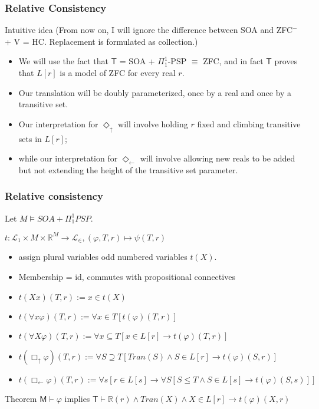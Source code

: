 \documentclass{beamer}
\newcommand{\du}{\Diamond_\uparrow}
\newcommand{\dl}{\Diamond_\leftarrow}
\newcommand{\bu}{\Box_\uparrow}
\newcommand{\bl}{\Box_\leftarrow}
\begin{document}
\begin{frame}
    \frametitle{Relative Consistency}
\begin{block}{Intuitive idea}
     (From now on, I will ignore the difference between SOA 
    and ZFC$^-$+ V = HC. Replacement is formulated as collection.)
    \begin{itemize}
    \item<3-> We will use the fact that $\mathsf{T}$ = SOA + $\Pi_1^1$-PSP 
    $\equiv$ ZFC, and in fact $\mathsf{T}$ proves that $L[r]$ is a 
    model of ZFC for every real $r$. 
    \item<4-> 
    Our translation will be doubly parameterized, once by a real and 
    once by a transitive set.
    \item<5->
    Our interpretation for $\du$ will involve holding $r$ fixed and 
    climbing transitive sets in $L[r]$;
    \item<6-> 
    while our interpretation for $\dl$ will involve allowing new reals 
    to be added but not extending the height of the transitive set parameter.
    \end{itemize}
\end{block}
\end{frame}
\begin{frame}
    \frametitle{Relative consistency}
     Let $M \vDash SOA + \Pi_1^1 PSP$.
    \begin{block}{$t : \mathcal{L}_1 \times M \times \mathbb{R}^M \to \mathcal{L}_\in, (\varphi, T, r) \mapsto \psi(T, r)$}
        \begin{itemize}
            \item<4-> assign plural variables odd numbered variables $t(X)$.
            \item<5-> Membership = id, commutes with propositional connectives 
            \item<6-> $t(Xx)(T, r) := x \in t(X)$
            \item<7-> $t(\forall x \varphi)(T, r) := \forall x \in T [t(\varphi)(T, r)]$
            \item<8-> $t(\forall X \varphi)(T, r) := \forall x \subseteq T [x \in L[r] \rightarrow t(\varphi)(T, r)]$
            \item<9-> $t(\bu \varphi)(T, r) := \forall S \supseteq T [Tran(S) \wedge S \in L[r] \rightarrow t(\varphi)(S, r)]$
            \item<10-> $t(\bl \varphi)(T, r) := \forall s[ r \in L[s] \rightarrow \forall S[ S \leq T \wedge S \in L[s] \rightarrow t(\varphi)(S, s)]]$
        \end{itemize}
    \end{block}
\begin{block}{Theorem}
  $\mathsf{M} \vdash \varphi$ implies $\mathsf{T} \vdash \mathbb{R}(r) \wedge Tran(X) \wedge X \in L[r] \rightarrow t(\varphi)(X, r)$  
\end{block}
\end{frame}
\end{document}
